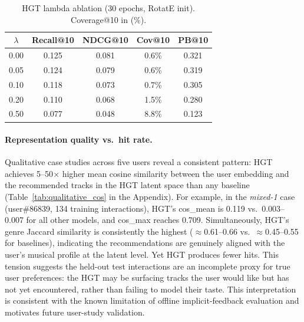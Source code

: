 \begin{table}[h]
\centering\footnotesize
\caption{HGT lambda ablation (30 epochs, RotatE init). Coverage@10 in (\%).}
\label{tab:lambda}
\setlength{\tabcolsep}{5pt}
\renewcommand{\arraystretch}{1.1}
\begin{tabular}{ccccc}
\toprule
$\lambda$ & Recall@10 & NDCG@10 & Cov@10 & PB@10\\
\midrule
0.00 & 0.125 & 0.081 & 0.6\% & 0.321\\
0.05 & 0.124 & 0.079 & 0.6\% & 0.319\\
0.10 & 0.118 & 0.073 & 0.7\% & 0.305\\
0.20 & 0.110 & 0.068 & 1.5\% & 0.280\\
0.50 & 0.077 & 0.048 & 8.8\% & 0.123\\
\bottomrule
\end{tabular}
\end{table}

\paragraph{Representation quality vs.\ hit rate.}
Qualitative case studies across five users reveal a consistent pattern: HGT achieves 5–50$\times$ higher mean cosine similarity between the user embedding and the recommended tracks in the HGT latent space than any baseline (Table~\ref{tab:qualitative_cos} in the Appendix). For example, in the \textit{mixed-1} case (user\#86839, 134 training interactions), HGT's cos\_mean is 0.119 vs.\ 0.003–0.007 for all other models, and cos\_max reaches 0.709. Simultaneously, HGT's genre Jaccard similarity is consistently the highest ($\approx$0.61–0.66 vs.\ $\approx$0.45–0.55 for baselines), indicating the recommendations are genuinely aligned with the user's musical profile at the latent level. Yet HGT produces fewer hits. This tension suggests the held-out test interactions are an incomplete proxy for true user preferences: the HGT may be surfacing tracks the user would like but has not yet encountered, rather than failing to model their taste. This interpretation is consistent with the known limitation of offline implicit-feedback evaluation and motivates future user-study validation.

